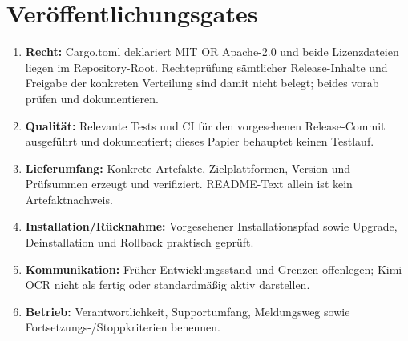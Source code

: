 \documentclass[11pt,a4paper]{scrartcl}
\begin{document}
\section{Veröffentlichungsgates}\label{sec:gates}
\begin{enumerate}
\item \textbf{Recht:} Cargo.toml deklariert MIT OR Apache-2.0 und beide Lizenzdateien liegen im Repository-Root. Rechteprüfung sämtlicher Release-Inhalte und Freigabe der konkreten Verteilung sind damit nicht belegt; beides vorab prüfen und dokumentieren.
\item \textbf{Qualität:} Relevante Tests und CI für den vorgesehenen Release-Commit ausgeführt und dokumentiert; dieses Papier behauptet keinen Testlauf.
\item \textbf{Lieferumfang:} Konkrete Artefakte, Zielplattformen, Version und Prüfsummen erzeugt und verifiziert. README-Text allein ist kein Artefaktnachweis.
\item \textbf{Installation/Rücknahme:} Vorgesehener Installationspfad sowie Upgrade, Deinstallation und Rollback praktisch geprüft.
\item \textbf{Kommunikation:} Früher Entwicklungsstand und Grenzen offenlegen; Kimi OCR nicht als fertig oder standardmäßig aktiv darstellen.
\item \textbf{Betrieb:} Verantwortlichkeit, Supportumfang, Meldungsweg sowie Fortsetzungs-/Stoppkriterien benennen.
\end{enumerate}
\end{document}
